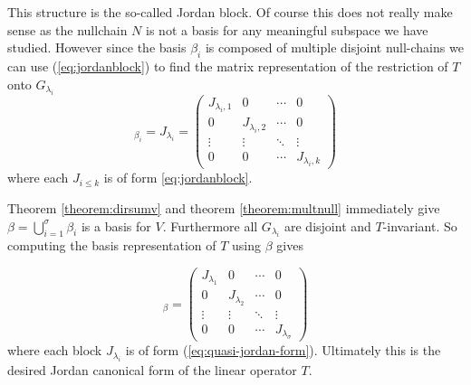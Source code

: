 This structure is the so-called Jordan block. Of course this does not really make sense as the nullchain \(N\) is not a basis for any meaningful subspace we have studied. However since the basis \(\beta_i\) is composed of multiple disjoint null-chains we can use (\ref{eq:jordanblock}) to find the matrix representation of the restriction of \(T\) onto \(G_{\lambda_i}\)
\begin{equation}
    [T|_{G_{\lambda_i}}] _{ \beta_i} = J_{\lambda_i} =
    \begin{pmatrix}
        J_{\lambda_i, 1}    & 0      & \cdots & 0      \\
        0      & J_{\lambda_i, 2}   & \cdots & 0      \\
        \vdots & \vdots & \ddots & \vdots \\
        0      & 0      & \cdots & J_{\lambda_i, k} 
    \end{pmatrix}
    \label{eq:quasi-jordan-form}
\end{equation}
where each \(J_{i \leq k}\) is of form \eqref{eq:jordanblock}.


Theorem \ref{theorem:dirsumv} and theorem \ref{theorem:multnull} immediately give  $\beta=\bigcup_{i=1}^{\sigma}\beta_i$ is a basis for $V$.
 Furthermore all \(G_{\lambda_i} \) are disjoint and \(T\)-invariant. So computing the basis representation of \(T\) using \(\beta\) gives

\begin{equation}
    [T]_\beta=
    \begin{pmatrix}
        J_{\lambda_1}    & 0      & \cdots & 0      \\
        0      & J_{\lambda_2}    & \cdots & 0      \\
        \vdots & \vdots & \ddots & \vdots \\
        0      & 0      & \cdots & J_{\lambda_\sigma}
    \end{pmatrix}
    \label{eq:jordan-form}
\end{equation}
where each block $J_{\lambda_i}$ is of form (\ref{eq:quasi-jordan-form}).
Ultimately this is the desired Jordan canonical form of the linear operator $T$.